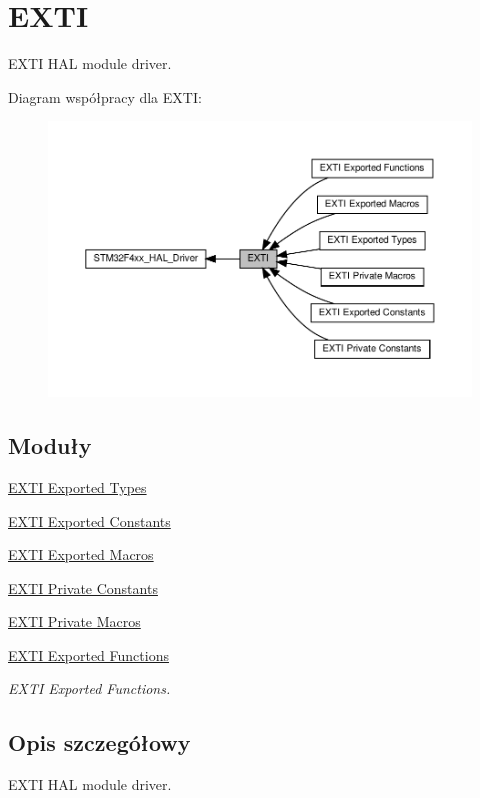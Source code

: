 \hypertarget{group___e_x_t_i}{}\section{E\+X\+TI}
\label{group___e_x_t_i}


E\+X\+TI H\+AL module driver.  


Diagram współpracy dla E\+X\+TI\+:\nopagebreak
\begin{figure}[H]
\begin{center}
\leavevmode
\includegraphics[width=350pt]{group___e_x_t_i}
\end{center}
\end{figure}
\subsection*{Moduły}
\begin{DoxyCompactItemize}
\item 
\hyperlink{group___e_x_t_i___exported___types}{E\+X\+T\+I Exported Types}
\item 
\hyperlink{group___e_x_t_i___exported___constants}{E\+X\+T\+I Exported Constants}
\item 
\hyperlink{group___e_x_t_i___exported___macros}{E\+X\+T\+I Exported Macros}
\item 
\hyperlink{group___e_x_t_i___private___constants}{E\+X\+T\+I Private Constants}
\item 
\hyperlink{group___e_x_t_i___private___macros}{E\+X\+T\+I Private Macros}
\item 
\hyperlink{group___e_x_t_i___exported___functions}{E\+X\+T\+I Exported Functions}
\begin{DoxyCompactList}\small\item\em E\+X\+TI Exported Functions. \end{DoxyCompactList}\end{DoxyCompactItemize}


\subsection{Opis szczegółowy}
E\+X\+TI H\+AL module driver. 

